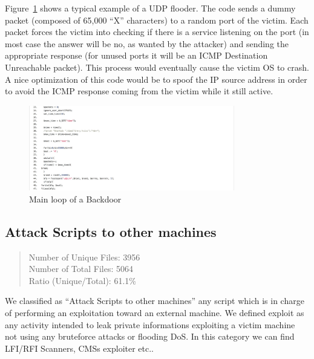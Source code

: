 Figure~\ref{fig:flooder} shows a typical example of a UDP flooder. The code sends a dummy packet (composed of 65,000 ``X'' characters) to a random port of the victim. Each packet forces the victim into checking if there is a service listening on the port (in most case the answer will be no, as wanted by the attacker) and sending the appropriate response (for unused ports it will be an ICMP Destination Unreachable packet). This process would eventually cause the victim OS to crash. A nice optimization of this code would be to spoof the IP source address in order to avoid the ICMP response coming from the victim while it still active.

\begin{figure}[H]
\centerline{\includegraphics[width=0.8\textwidth]{Images/flooder.jpg}}
\caption{Main loop of a Backdoor\label{fig:flooder}}
\end{figure}

\subsection{Attack Scripts to other machines}

\begin{quote}
Number of Unique Files: 3956\\
Number of Total Files: 5064\\
Ratio (Unique/Total): 61.1\%
\end{quote}

We classified as ``Attack Scripts to other machines'' any script which is in charge of performing an exploitation toward an external machine. We defined exploit as any activity intended to leak private informations exploiting a victim machine not using any bruteforce attacks or flooding DoS. In this category we can find LFI/RFI Scanners, CMSs exploiter etc..


